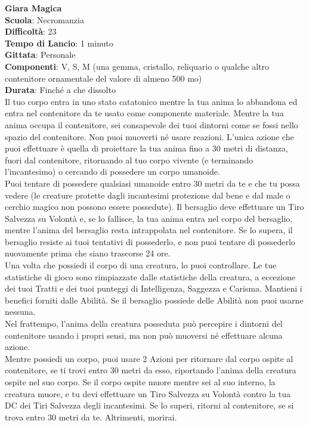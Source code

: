 \begin{multicols}{2}
\medskip\textbf{Giara Magica}\\
\textbf{Scuola}: Necromanzia\\
\textbf{Difficoltà}: 23\\
\textbf{Tempo di Lancio}: 1 minuto\\
\textbf{Gittata}: Personale\\
\textbf{Componenti}: V, S, M (una gemma, cristallo, reliquario o qualche altro contenitore ornamentale del valore di almeno 500 mo)\\
\textbf{Durata}: Finché a che dissolto\\
Il tuo corpo entra in uno stato catatonico mentre la tua anima lo abbandona ed entra nel contenitore da te usato come componente materiale. Mentre la tua anima occupa il contenitore, sei consapevole dei tuoi dintorni come se fossi nello spazio del contenitore. Non puoi muoverti né usare reazioni. L'unica azione che puoi effettuare è quella di proiettare la tua anima fino a 30 metri di distanza, fuori dal contenitore, ritornando al tuo corpo vivente (e terminando l'incantesimo) o cercando di possedere un corpo umanoide.\\
Puoi tentare di possedere qualsiasi umanoide entro 30 metri da te e che tu possa vedere (le creature protette dagli incantesimi protezione dal bene e dal male o cerchio magico non possono essere possedute). Il bersaglio deve effettuare un Tiro Salvezza su Volontà e, se lo fallisce, la tua anima entra nel corpo del bersaglio, mentre l'anima del bersaglio resta intrappolata nel contenitore. Se lo supera, il bersaglio resiste ai tuoi tentativi di possederlo, e non puoi tentare di possederlo nuovamente prima che siano trascorse 24 ore.\\
Una volta che possiedi il corpo di una creatura, lo puoi controllare. Le tue statistiche di gioco sono rimpiazzate dalle statistiche della creatura, a eccezione dei tuoi Tratti e dei tuoi punteggi di Intelligenza, Saggezza e Carisma. Mantieni i benefici forniti dalle Abilità. Se il bersaglio possiede delle Abilità non puoi usarne nessuna.\\
Nel frattempo, l'anima della creatura posseduta può percepire i dintorni del contenitore usando i propri sensi, ma non può muoversi né effettuare alcuna azione.\\
Mentre possiedi un corpo, puoi usare 2 Azioni per ritornare dal corpo ospite al contenitore, se ti trovi entro 30 metri da esso, riportando l'anima della creatura ospite nel suo corpo. Se il corpo ospite muore mentre sei al suo interno, la creatura muore, e tu devi effettuare un Tiro Salvezza su Volontà contro la tua DC dei Tiri Salvezza degli incantesimi. Se lo superi, ritorni al contenitore, se si trova entro 30 metri da te. Altrimenti, morirai.\\

\end{multicols}
